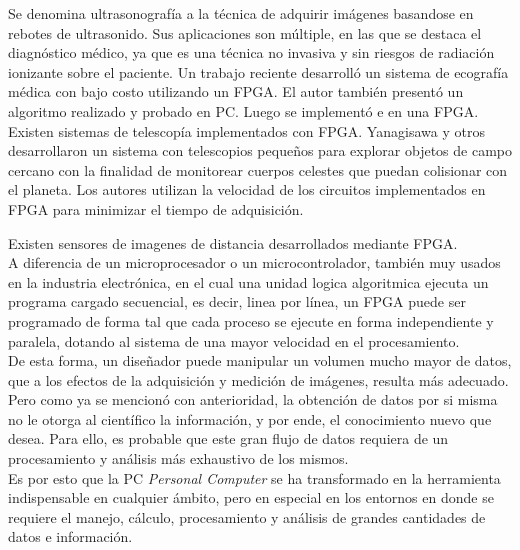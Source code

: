 Se denomina ultrasonografía a la técnica de adquirir imágenes basandose en rebotes de ultrasonido. Sus aplicaciones son múltiple, en las que se destaca el diagnóstico médico, ya que es una técnica no invasiva y sin riesgos de radiación ionizante sobre el paciente. Un trabajo reciente desarrolló un sistema de ecografía médica con bajo costo utilizando un FPGA\cite{biswas2018embedded}. El autor también presentó un algoritmo realizado y probado en PC. Luego se implementó e en una FPGA.\\

Existen sistemas de telescopía implementados con FPGA. Yanagisawa y otros desarrollaron un sistema con telescopios pequeños para explorar objetos de campo cercano con la finalidad de monitorear cuerpos celestes que puedan colisionar con el planeta\cite{Yanagisawa2018}. Los autores utilizan la velocidad de los circuitos implementados en FPGA para minimizar el tiempo de adquisición.

Existen sensores de imagenes de distancia desarrollados mediante FPGA\cite{Cui2018}.\\%

A diferencia de un microprocesador o un microcontrolador, también muy usados en la industria electrónica, en el cual una unidad logica algoritmica ejecuta un programa cargado secuencial, es decir, linea por línea, un FPGA puede ser programado de forma tal que cada proceso se ejecute en forma independiente y paralela, dotando al sistema de una mayor velocidad en el procesamiento.\\

De esta forma, un diseñador puede manipular un volumen mucho mayor de datos, que a los efectos de la adquisición y medición de imágenes, resulta más adecuado.\\

Pero como ya se mencionó con anterioridad, la obtención de datos por si misma no le otorga al científico la información, y por ende, el conocimiento nuevo que desea. Para ello, es probable que este gran flujo de datos requiera de un procesamiento y análisis más exhaustivo de los mismos.\\

Es por esto que la PC {\it Personal Computer} se ha transformado en la herramienta indispensable en cualquier ámbito, pero en especial en los entornos en donde se requiere el  manejo, cálculo, procesamiento y análisis de grandes cantidades de datos e información.\\

